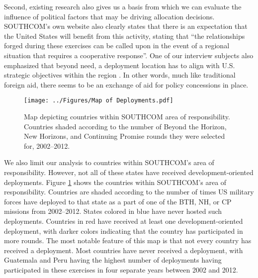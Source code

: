\documentclass[12pt]{article}
\begin{document}
\begin{doublespace}
Second, existing research also gives us a basis from which we can evaluate the influence of political factors that may be driving allocation decisions. SOUTHCOM's own website also clearly states that there is an expectation that the United States will benefit from this activity, stating that ``the relationships forged during these exercises can be called upon in the event of a regional situation that requires a cooperative response''\cite{southcom2015}.  One of our interview subjects also emphasized that beyond need, a deployment location has to align with U.S. strategic objectives within the region \cite{CPT20160309}.  In other words, much like traditional foreign aid, there seems to be an exchange of aid for policy concessions in place.

\begin{figure}[t]
\begin{center}
\texttt{[image: ../Figures/Map of Deployments.pdf]}
\caption{Map depicting countries within SOUTHCOM area of responsibility. Countries shaded according to the number of Beyond the Horizon, New Horizons, and Continuing Promise rounds they were selected for, 2002--2012.}
\label{fig:map1}
\end{center}
\end{figure}

We also limit our analysis to countries within SOUTHCOM's area of responsibility. However, not all of these states have received development-oriented deployments. Figure \ref{fig:map1} shows the countries within SOUTHCOM's area of responsibility. Countries are shaded according to the number of times US military forces have deployed to that state as a part of one of the BTH, NH, or CP missions from 2002--2012. States colored in blue have never hosted such deployments. Countries in red have received at least one development-oriented deployment, with darker colors indicating that the country has participated in more rounds. The most notable feature of this map is that not every country has received a deployment. Most countries have never received a deployment, with Guatemala and Peru having the highest number of deployments having participated in these exercises in four separate years between 2002 and 2012.
 

\end{doublespace}
\end{document}
